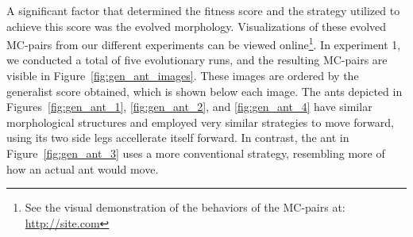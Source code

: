             A significant factor that determined the fitness score and the strategy utilized to achieve this score was the evolved morphology. Visualizations of these evolved MC-pairs from our different experiments can be viewed online\footnote{See the visual demonstration of the behaviors of the MC-pairs at: \url{http://site.com}}. In experiment 1, we conducted a total of five evolutionary runs, and the resulting MC-pairs are visible in Figure~\ref{fig:gen_ant_images}. These images are ordered by the generalist score obtained, which is shown below each image. The ants depicted in Figures~\ref{fig:gen_ant_1}, \ref{fig:gen_ant_2}, and \ref{fig:gen_ant_4} have similar morphological structures and employed very similar strategies to move forward, using its two side legs accellerate itself forward. In contrast, the ant in Figure~\ref{fig:gen_ant_3} uses a more conventional strategy, resembling more of how an actual ant would move.

